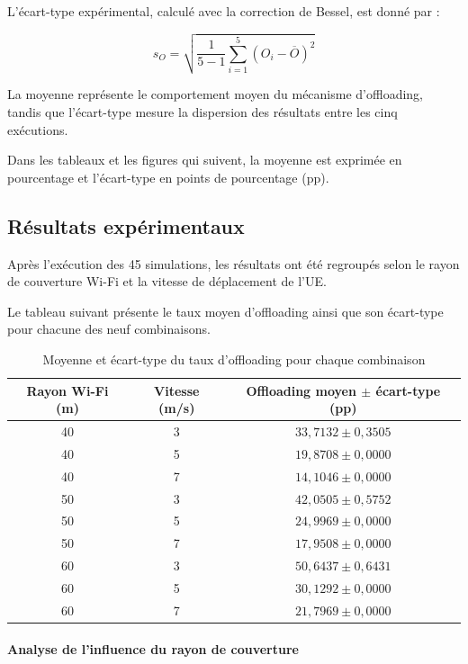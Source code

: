 L'écart-type expérimental, calculé avec la correction de Bessel,
est donné par :

\[
\boxed{
s_O =
\sqrt{
\frac{1}{5-1}
\sum_{i=1}^{5}
(O_i-\overline{O})^2
}
}
\]

La moyenne représente le comportement moyen du mécanisme
d'offloading, tandis que l'écart-type mesure la dispersion
des résultats entre les cinq exécutions.

Dans les tableaux et les figures qui suivent, la moyenne
est exprimée en pourcentage et l'écart-type en points
de pourcentage (pp).

\subsection{Résultats expérimentaux}

Après l'exécution des 45 simulations, les résultats ont été
regroupés selon le rayon de couverture Wi-Fi et la vitesse
de déplacement de l'UE.

Le tableau suivant présente le taux moyen d'offloading ainsi
que son écart-type pour chacune des neuf combinaisons.

\begin{table}[H]
\centering
\caption{Moyenne et écart-type du taux d'offloading pour
chaque combinaison}
\label{tab:B6_results}
\small
\begin{tabular}{ccc}
\toprule
\textbf{Rayon Wi-Fi (m)} &
\textbf{Vitesse (m/s)} &
\textbf{Offloading moyen $\pm$ écart-type (pp)}\\
\midrule
40 & 3 & \(33{,}7132 \pm 0{,}3505\)\\
40 & 5 & \(19{,}8708 \pm 0{,}0000\)\\
40 & 7 & \(14{,}1046 \pm 0{,}0000\)\\
\midrule
50 & 3 & \(42{,}0505 \pm 0{,}5752\)\\
50 & 5 & \(24{,}9969 \pm 0{,}0000\)\\
50 & 7 & \(17{,}9508 \pm 0{,}0000\)\\
\midrule
60 & 3 & \(50{,}6437 \pm 0{,}6431\)\\
60 & 5 & \(30{,}1292 \pm 0{,}0000\)\\
60 & 7 & \(21{,}7969 \pm 0{,}0000\)\\
\bottomrule
\end{tabular}
\end{table}

\paragraph{Analyse de l'influence du rayon de couverture}

